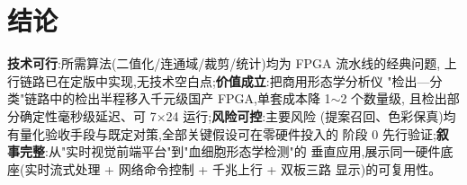 \section{结论}

\textbf{技术可行}:所需算法(二值化/连通域/裁剪/统计)均为 FPGA 流水线的经典问题,
上行链路已在定版中实现,无技术空白点;\textbf{价值成立}:把商用形态学分析仪
"检出—分类"链路中的检出半程移入千元级国产 FPGA,单套成本降 1$\sim$2 个数量级,
且检出部分确定性毫秒级延迟、可 7$\times$24 运行;\textbf{风险可控}:主要风险
(提案召回、色彩保真)均有量化验收手段与既定对策,全部关键假设可在零硬件投入的
阶段 0 先行验证;\textbf{叙事完整}:从"实时视觉前端平台"到"血细胞形态学检测"的
垂直应用,展示同一硬件底座(实时流式处理 + 网络命令控制 + 千兆上行 + 双板三路
显示)的可复用性。
